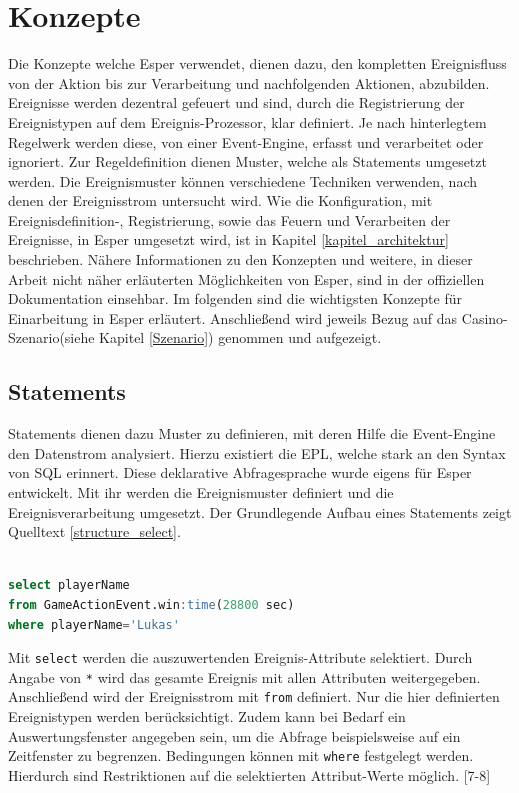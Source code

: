 \chapter{Konzepte}
Die Konzepte welche Esper verwendet, dienen dazu, den kompletten Ereignisfluss von der Aktion bis zur Verarbeitung und nachfolgenden Aktionen, abzubilden.
Ereignisse werden dezentral gefeuert und sind, durch die Registrierung der Ereignistypen auf dem Ereignis-Prozessor, klar definiert. Je nach hinterlegtem Regelwerk werden diese, von einer Event-Engine, erfasst und verarbeitet oder ignoriert. Zur Regeldefinition dienen Muster, welche als Statements umgesetzt werden. Die Ereignismuster können verschiedene Techniken verwenden, nach denen der Ereignisstrom untersucht wird. 
Wie die Konfiguration, mit Ereignisdefinition-, Registrierung, sowie das Feuern und Verarbeiten der Ereignisse, in Esper umgesetzt wird, ist in Kapitel \ref{kapitel_architektur} beschrieben.
Nähere Informationen zu den Konzepten und weitere, in dieser Arbeit nicht näher erläuterten Möglichkeiten von Esper, sind in der offiziellen Dokumentation \cite{EsperRef2018} einsehbar.
\absatz
Im folgenden sind die wichtigsten Konzepte für Einarbeitung in Esper erläutert. Anschließend wird jeweils Bezug auf das Casino-Szenario(siehe Kapitel \ref{Szenario}) genommen und aufgezeigt.

\section{Statements}
\label{statements}
Statements dienen dazu Muster zu definieren, mit deren Hilfe die Event-Engine den Datenstrom analysiert. Hierzu existiert die \acf{EPL}, welche stark an den Syntax von SQL erinnert. Diese deklarative Abfragesprache wurde eigens für Esper entwickelt. Mit ihr werden die Ereignismuster definiert und die Ereignisverarbeitung umgesetzt. Der Grundlegende Aufbau eines Statements zeigt Quelltext \ref{structure_select}.
\begin{lstlisting}[caption={Beispielhafter Aufbau eines Statements },label=structure_select,captionpos=b,language=SQL]

select playerName 
from GameActionEvent.win:time(28800 sec)
where playerName='Lukas'

\end{lstlisting}
Mit \texttt{select} werden die auszuwertenden Ereignis-Attribute selektiert. Durch Angabe von \texttt{*} wird das gesamte Ereignis mit allen Attributen weitergegeben.
Anschließend wird der Ereignisstrom mit \texttt{from} definiert.
Nur die hier definierten Ereignistypen werden berücksichtigt. Zudem kann bei Bedarf ein Auswertungsfenster angegeben sein, um die Abfrage beispielsweise auf ein Zeitfenster zu begrenzen.
Bedingungen können mit \texttt{where} festgelegt werden. Hierdurch sind Restriktionen auf die selektierten Attribut-Werte möglich.
\cite{EsperRef2018}[7-8]

